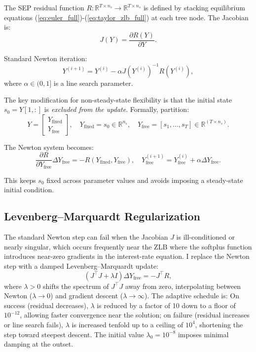 \documentclass[12pt]{article}
\theoremstyle{plain}
\theoremstyle{definition}
\theoremstyle{remark}
\newcommand{\R}{\mathbb{R}}
\begin{document}
The SEP residual function $R: \R^{T \times n_s} \to \R^{T \times n_s}$ is defined by stacking equilibrium equations (\ref{eq:euler_full})-(\ref{eq:taylor_zlb_full}) at each tree node. The Jacobian is:
\begin{equation}
J(Y) = \frac{\partial R(Y)}{\partial Y}.
\end{equation}

Standard Newton iteration:
\begin{equation}
Y^{(i+1)} = Y^{(i)} - \alpha J(Y^{(i)})^{-1} R(Y^{(i)}),
\end{equation}
where $\alpha \in (0,1]$ is a line search parameter.

The key modification for non-steady-state flexibility is that the initial state $s_0 = Y[1,:]$ is \emph{excluded from the update}. Formally, partition:
\begin{equation}
Y = \begin{bmatrix} Y_{\text{fixed}} \\ Y_{\text{free}} \end{bmatrix}, \quad Y_{\text{fixed}} = s_0 \in \R^{n_s}, \quad Y_{\text{free}} = [s_1, \ldots, s_T] \in \R^{(T \times n_s)}.
\end{equation}

The Newton system becomes:
\begin{equation}
\frac{\partial R}{\partial Y_{\text{free}}} \Delta Y_{\text{free}} = -R(Y_{\text{fixed}}, Y_{\text{free}}), \quad Y_{\text{free}}^{(i+1)} = Y_{\text{free}}^{(i)} + \alpha \Delta Y_{\text{free}}.
\end{equation}

This keeps $s_0$ fixed across parameter values and avoids imposing a steady-state initial condition.


\subsection{Levenberg--Marquardt Regularization}
\label{app:sep_lm}

The standard Newton step can fail when the Jacobian $J$ is ill-conditioned or nearly singular, which occurs frequently near the ZLB where the softplus function introduces near-zero gradients in the interest-rate equation. I replace the Newton step with a damped Levenberg--Marquardt update:
\begin{equation}
(J^\top J + \lambda I) \Delta Y_{\text{free}} = -J^\top R,
\end{equation}
where $\lambda > 0$ shifts the spectrum of $J^\top J$ away from zero, interpolating between Newton ($\lambda \to 0$) and gradient descent ($\lambda \to \infty$). The adaptive schedule is:
On success (residual decreases), $\lambda$ is reduced by a factor of 10 down to a floor of $10^{-12}$, allowing faster convergence near the solution; on failure (residual increases or line search fails), $\lambda$ is increased tenfold up to a ceiling of $10^4$, shortening the step toward steepest descent. The initial value $\lambda_0 = 10^{-8}$ imposes minimal damping at the outset.
\end{document}
